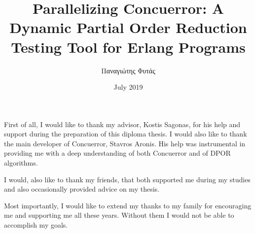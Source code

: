 \documentclass[diploma, greek]{softlab-thesis}
\theoremstyle{definition}
\begin{document}

\frontmatter

\title{Parallelizing Concuerror: A Dynamic Partial Order Reduction Testing Tool for Erlang Programs}
\author{Παναγιώτης Φυτάς}
\date{July 2019}




\maketitle



\begin{abstractgr}%
  

  
\begin{keywordsgr}

\end{keywordsgr}
\end{abstractgr}



\begin{abstracten}%
  

  
\begin{keywordsen}

\end{keywordsen}
\end{abstracten}



\iffalse
\begin{acknowledgementsgr}


\end{acknowledgementsgr}
\fi

\begin{acknowledgementsen}

First of all, I would like to thank my advisor, Kostis Sagonas, for his help and support
during the preparation of this diploma thesis. I would also like to thank the main developer of Concuerror, Stavros Aronis.
His help was instrumental in providing me with a deep understanding of both Concuerror and of DPOR algorithms.

I would, also like to thank my friends, that both supported me during my studies and also occasionally provided advice on my thesis.

Most importantly, I would like to extend my thanks to my family for encouraging me and supporting me all these years. Without them I would not be able to accomplish my goals.


\end{acknowledgementsen}
\end{document}
